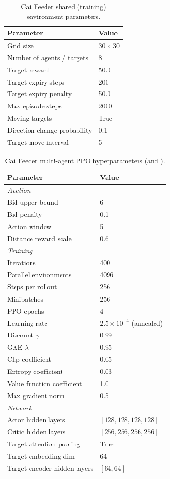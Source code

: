 \begin{table}[h]
\caption{Cat Feeder shared (training) environment parameters.}
\label{tab:cat-feeder-env-params}
\centering
\begin{tabular}{ll}
\toprule
Parameter & Value \\
\midrule
Grid size & $30 \times 30$ \\
Number of agents / targets & 8 \\
Target reward & 50.0 \\
Target expiry steps & 200 \\
Target expiry penalty & 50.0 \\
Max episode steps & 2000 \\
Moving targets & True \\
Direction change probability & 0.1 \\
Target move interval & 5 \\
\bottomrule
\end{tabular}
\end{table}

\begin{table}[h]
\caption{Cat Feeder multi-agent PPO hyperparameters (\allpay and \poorman).}
\label{tab:cat-feeder-mappo-hparams}
\centering
\begin{tabular}{ll}
\toprule
Parameter & Value \\
\midrule
\multicolumn{2}{l}{\textit{Auction}} \\
Bid upper bound & 6 \\
Bid penalty & 0.1 \\
Action window & 5 \\
Distance reward scale & 0.6 \\
\midrule
\multicolumn{2}{l}{\textit{Training}} \\
Iterations & 400 \\
Parallel environments & 4096 \\
Steps per rollout & 256 \\
Minibatches & 256 \\
PPO epochs & 4 \\
Learning rate & $2.5 \times 10^{-4}$ (annealed) \\
Discount $\gamma$ & 0.99 \\
GAE $\lambda$ & 0.95 \\
Clip coefficient & 0.05 \\
Entropy coefficient & 0.03 \\
Value function coefficient & 1.0 \\
Max gradient norm & 0.5 \\
\midrule
\multicolumn{2}{l}{\textit{Network}} \\
Actor hidden layers & $[128, 128, 128, 128]$ \\
Critic hidden layers & $[256, 256, 256, 256]$ \\
Target attention pooling & True \\
Target embedding dim & 64 \\
Target encoder hidden layers & $[64, 64]$ \\
\bottomrule
\end{tabular}
\end{table}

